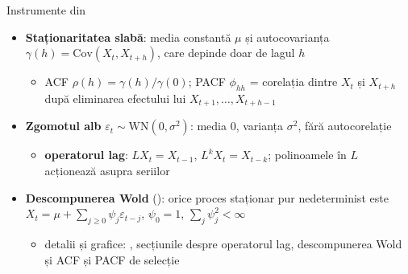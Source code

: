 \begin{frame}{Instrumente din }
\itemsize{\small}
\begin{itemize}
    \item \textbf{Staționaritatea slabă}: media constantă $\mu$ și autocovarianța $\gamma(h) = \mathrm{Cov}(X_t, X_{t+h})$, care depinde doar de lagul $h$
    \begin{itemize}
        \item ACF $\rho(h) = \gamma(h)/\gamma(0)$; PACF $\phi_{hh}$ = corelația dintre $X_t$ și $X_{t+h}$ după eliminarea efectului lui $X_{t+1}, \dots, X_{t+h-1}$
    \end{itemize}
    \item \textbf{Zgomotul alb} $\varepsilon_t \sim \mathrm{WN}(0, \sigma^2)$: media 0, varianța $\sigma^2$, fără autocorelație
    \begin{itemize}
        \item \textbf{operatorul lag}: $LX_t = X_{t-1}$, $L^kX_t = X_{t-k}$; polinoamele în $L$ acționează asupra seriilor
    \end{itemize}
    \item \textbf{Descompunerea Wold} (): orice proces staționar pur nedeterminist este $X_t = \mu + \sum_{j \ge 0}\psi_j\varepsilon_{t-j}$, $\psi_0 = 1$, $\sum_j\psi_j^2 < \infty$
    \begin{itemize}
        \item detalii și grafice: , secțiunile despre operatorul lag, descompunerea Wold și ACF și PACF de selecție
    \end{itemize}
\end{itemize}
\end{frame}

